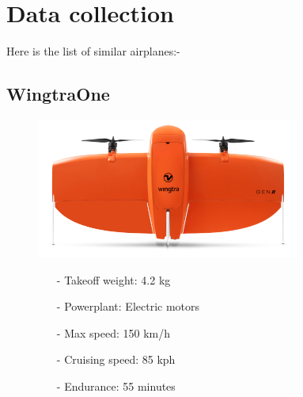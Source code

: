 \documentclass{article}
\begin{document}
\section{Data collection}
Here is the list of similar airplanes:-


\subsection{WingtraOne}

\begin{figure}[h]
    \begin{minipage}[b]{.45\linewidth}
        \centering
        \includegraphics[width=0.7\linewidth]{Aircraft pics/WingtraOne.png}
        
    \end{minipage}\hfill
    \begin{minipage}[b]{0.45\linewidth}
        \begin{itemize}
            \item [-] Takeoff weight: 4.2 kg
            \item [-] Powerplant: Electric motors
            \item [-] Max speed: 150 km/h 
            \item [-] Cruising speed: 85 kph 
            \item [-] Endurance: 55 minutes
        \end{itemize}
    \end{minipage}
\end{figure}

\vspace{\fill}

\clearpage
\end{document}
